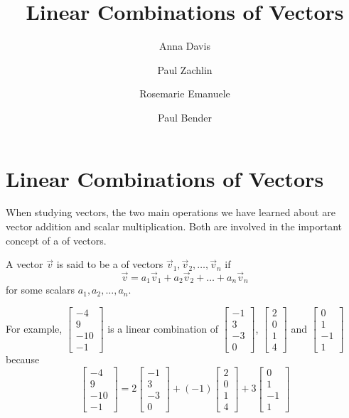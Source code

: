 \documentclass{ximera}
\author{Anna Davis\and Paul Zachlin  \and Rosemarie Emanuele \and Paul Bender} \title{Linear Combinations of Vectors} \license{CC-BY 4.0}
\begin{document}
\begin{abstract}
 \end{abstract}
\maketitle
\section*{Linear Combinations of Vectors}

When studying vectors, the two main operations we have learned about are vector addition and scalar multiplication.  Both are involved in the important concept of a  of vectors.

\begin{definition}\label{def:lincomb}
A vector $\vec{v}$ is said to be a  of vectors $\vec{v}_1, \vec{v}_2,\ldots, \vec{v}_n$ if 
$$\vec{v}=a_1\vec{v}_1+ a_2\vec{v}_2+\ldots + a_n\vec{v}_n$$
for some scalars $a_1, a_2, \ldots ,a_n$.
\end{definition}
For example, $\begin{bmatrix} -4\\9\\-10\\-1\end{bmatrix}$ is a linear combination of $\begin{bmatrix} -1\\3\\-3\\0\end{bmatrix}$,
$\begin{bmatrix} 2\\0\\1\\4\end{bmatrix}$ and $\begin{bmatrix} 0\\1\\-1\\1\end{bmatrix}$ because 
$$\begin{bmatrix} -4\\9\\-10\\-1\end{bmatrix}=2\begin{bmatrix} -1\\3\\-3\\0\end{bmatrix}+(-1)\begin{bmatrix} 2\\0\\1\\4\end{bmatrix}+3\begin{bmatrix} 0\\1\\-1\\1\end{bmatrix}$$
\end{document}

